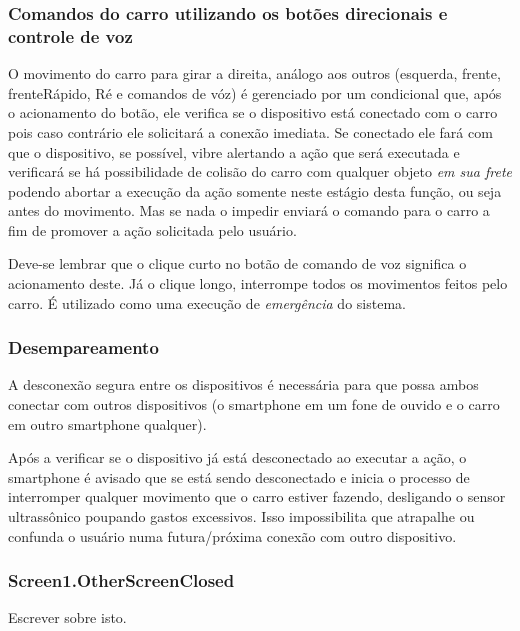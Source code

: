 \documentclass[portugues, brazil, a4paper,12pt]{article}
\begin{document}
\subsubsection{Comandos do carro utilizando os botões direcionais e controle de voz}
O movimento do carro para girar a direita, análogo aos outros (esquerda, frente, frenteRápido, Ré e comandos de vóz) é gerenciado por um condicional que, após o acionamento do botão, ele verifica se o dispositivo está conectado com o carro pois caso contrário ele solicitará a conexão imediata. Se conectado ele fará com que o dispositivo, se possível, vibre alertando a ação que será executada e verificará se há possibilidade de colisão do carro com qualquer objeto \textit{em sua frete} podendo abortar a execução da ação somente neste estágio desta função, ou seja antes do movimento. Mas se nada o impedir enviará o comando para o carro a fim de promover a ação solicitada pelo usuário.

Deve-se lembrar que o clique curto no botão de comando de voz significa o acionamento deste. Já o clique longo, interrompe todos os movimentos feitos pelo carro. É utilizado como uma execução de \textit{emergência} do sistema.

\subsubsection{Desempareamento}
A desconexão segura entre os dispositivos é necessária para que possa ambos conectar com outros dispositivos (o smartphone em um fone de ouvido e o carro em outro smartphone qualquer).

Após a verificar se o dispositivo já está desconectado ao executar a ação, o smartphone é avisado que se está sendo desconectado e inicia o processo de interromper qualquer movimento que o carro estiver fazendo, desligando o sensor ultrassônico poupando gastos excessivos. Isso impossibilita que atrapalhe ou confunda o usuário numa futura/próxima conexão com outro dispositivo.

\subsubsection{Screen1.OtherScreenClosed}
Escrever sobre isto.


\end{document}
